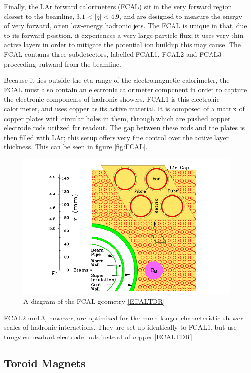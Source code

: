 Finally, the LAr forward calorimeters (FCAL) sit in the very forward region closest to the beamline, $3.1<|\eta |< 4.9$, and are designed to measure the energy of very forward, often low-energy hadronic jets.  The FCAL is unique in that, due to its forward position, it experiences a very large particle flux; it uses very thin active layers in order to mitigate the potential ion buildup this may cause.  The FCAL contains three subdetectors, labelled FCAL1, FCAL2 and FCAL3 proceeding outward from the beamline.

Because it lies outside the eta range of the electromagnetic calorimeter, the FCAL must also contain an electronic calorimeter component in order to capture the electronic components of hadronic showers. FCAL1 is this electronic calorimeter, and uses copper as its active material. It is composed of a matrix of copper plates with circular holes in them, through which are pushed copper electrode rods utilized for readout. The gap between these rods and the plates is then filled with LAr; this setup offers very fine control over the active layer thickness. This can be seen in figure \ref{fig:FCAL}.

\begin{figure}
  \includegraphics[width=\linewidth]{figures/detector_chapter/FCAL.png}
  \caption{A diagram of the FCAL geometry \ref{ECALTDR}}
  \label{fig:FCALDiagram}
\end{figure}


FCAL2 and 3, however, are optimized for the much longer characteristic shower scales of hadronic interactions. They are set up identically to FCAL1, but use tungsten readout electrode rods instead of copper \ref{ECALTDR}.

\subsection{Toroid Magnets} \label{sec:toroids}

